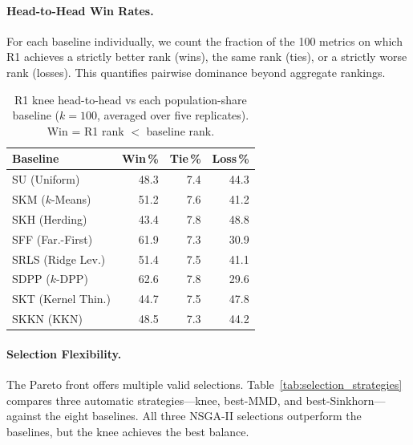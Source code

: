 \documentclass[10pt,journal]{IEEEtran}
\newcommand{\1}{\mathbf{1}}
\theoremstyle{ieeethm}
\begin{document}
\paragraph{Head-to-Head Win Rates.}
For each baseline individually, we count the fraction of the 100 metrics on which R1
achieves a strictly better rank (wins), the same rank (ties), or a strictly worse rank
(losses). This quantifies pairwise dominance beyond aggregate rankings.

\begin{table}[t]
\centering
\caption{R1 knee head-to-head vs each population-share baseline ($k=100$,
averaged over five replicates). Win = R1 rank $<$ baseline rank.}
\label{tab:baseline_head2head}
\small
\begin{tabular}{@{}l r r r@{}}
\toprule
Baseline & Win\,\% & Tie\,\% & Loss\,\% \\
\midrule
SU  (Uniform)       & 48.3 & 7.4 & 44.3 \\
SKM ($k$-Means)     & 51.2 & 7.6 & 41.2 \\
SKH (Herding)       & 43.4 & 7.8 & 48.8 \\
SFF (Far.-First)    & 61.9 & 7.3 & 30.9 \\
SRLS (Ridge Lev.)   & 51.4 & 7.5 & 41.1 \\
SDPP ($k$-DPP)      & 62.6 & 7.8 & 29.6 \\
SKT (Kernel Thin.)  & 44.7 & 7.5 & 47.8 \\
SKKN (KKN)          & 48.5 & 7.3 & 44.2 \\
\bottomrule
\end{tabular}
\end{table}

\paragraph{Selection Flexibility.}
The Pareto front offers multiple valid selections. Table~\ref{tab:selection_strategies}
compares three automatic strategies---knee, best-MMD, and best-Sinkhorn---against the
eight baselines. All three NSGA-II selections outperform the baselines, but the knee
achieves the best balance.
\end{document}
